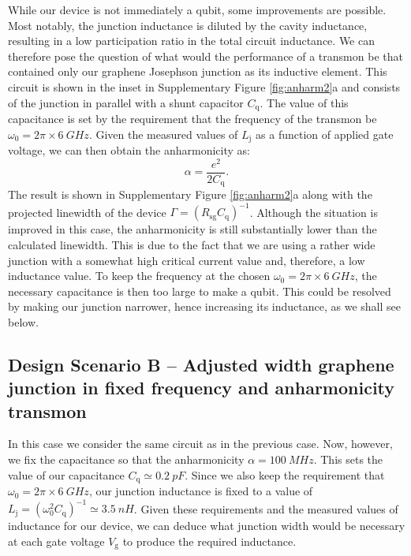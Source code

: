 While our device is not immediately a qubit, some improvements are possible.
Most notably, the junction inductance is diluted by the cavity inductance, resulting in a low participation ratio in the total circuit inductance.
We can therefore pose the question of what would the performance of a transmon be that contained only our graphene Josephson junction as its inductive element.
This circuit is shown in the inset in Supplementary Figure \ref{fig:anharm2}a and consists of the junction in parallel with a shunt capacitor $C_\text{q}$.
The value of this capacitance is set by the requirement that the frequency of the transmon be $\omega_0 = 2\pi\times\SI{6}{GHz}$.
Given the measured values of $L_\text{j}$ as a function of applied gate voltage, we can then obtain the anharmonicity as:
\begin{equation}
\alpha = \frac{e^2}{2C_\text{q}}.
\end{equation}
The result is shown in Supplementary Figure \ref{fig:anharm2}a along with the projected linewidth of the device $\Gamma = (R_\text{sg}C_\text{q})^{-1}$.
Although the situation is improved in this case, the anharmonicity is still substantially lower than the calculated linewidth.
This is due to the fact that we are using a rather wide junction with a somewhat high critical current value and, therefore, a low inductance value.
To keep the frequency at the chosen $\omega_0 = 2\pi\times\SI{6}{GHz}$, the necessary capacitance is then too large to make a qubit.
This could be resolved by making our junction narrower, hence increasing its inductance, as we shall see below.



\subsection{Design Scenario B -- Adjusted width graphene junction in fixed frequency and anharmonicity transmon}\label{sec:scenB}

In this case we consider the same circuit as in the previous case.
Now, however, we fix the capacitance so that the anharmonicity $\alpha = \SI{100}{MHz}$.
This sets the value of our capacitance $C_\text{q}\simeq\SI{0.2}{pF}$.
Since we also keep the requirement that $\omega_0 = 2\pi\times\SI{6}{GHz}$, our junction inductance is fixed to a value of $L_\text{j} = (\omega_0^2C_\text{q})^{-1} \simeq \SI{3.5}{nH}$.  
Given these requirements and the measured values of inductance for our device, we can deduce what junction width would be necessary at each gate voltage $V_\text{g}$ to produce the required inductance.

